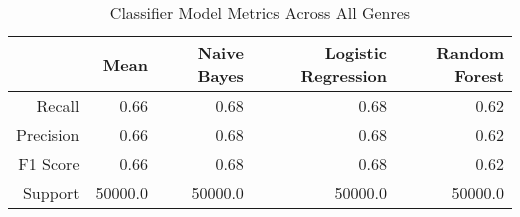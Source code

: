 \begin{table}[h]
    \centering
    \begin{tabular}{r|r|r|r|r}
         & Mean & Naive Bayes & Logistic Regression & Random Forest \\\hline
        Recall     & 0.66 & 0.68 & 0.68 & 0.62 \\
        Precision  & 0.66 & 0.68 & 0.68 & 0.62 \\
        F1 Score   & 0.66 & 0.68 & 0.68 & 0.62 \\
        Support    & 50000.0 & 50000.0 & 50000.0 & 50000.0
\end{tabular}
    \caption{Classifier Model Metrics Across All Genres}
    \label{tab:mode_aggregation_metrics_table}
\end{table}